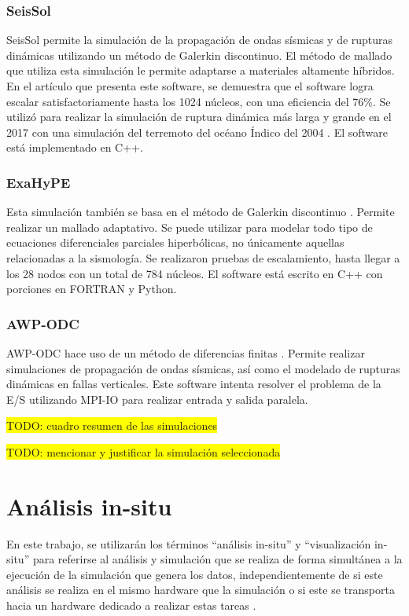 \subsubsection{SeisSol}
SeisSol \cite{Kser2010} permite la simulación de la propagación de ondas sísmicas y de rupturas dinámicas utilizando un método de Galerkin discontinuo. El método de mallado que utiliza esta simulación le permite adaptarse a materiales altamente híbridos. En el artículo que presenta este software, se demuestra que el software logra escalar satisfactoriamente hasta los 1024 núcleos, con una eficiencia del 76\%. Se utilizó para realizar la simulación de ruptura dinámica más larga y grande en el 2017 con una simulación del terremoto del océano Índico del 2004 \cite{Uphoff2017}. El software está implementado en C++.

\subsubsection{ExaHyPE}
Esta simulación también se basa en el método de Galerkin discontinuo \cite{Reinarz2020}. Permite realizar un mallado adaptativo. Se puede utilizar para modelar todo tipo de ecuaciones diferenciales parciales hiperbólicas, no únicamente aquellas relacionadas a la sismología. Se realizaron pruebas de escalamiento, hasta llegar a los 28 nodos con un total de 784 núcleos. El software está escrito en C++ con porciones en FORTRAN y Python.
\subsubsection{AWP-ODC}
AWP-ODC hace uso de un método de diferencias finitas \cite{Cui2010}. Permite realizar simulaciones de propagación de ondas sísmicas, así como el modelado de rupturas dinámicas en fallas verticales. Este software intenta resolver el problema de la E/S utilizando MPI-IO para realizar entrada y salida paralela.


\colorbox{yellow}{TODO: cuadro resumen de las simulaciones}

\colorbox{yellow}{TODO: mencionar y justificar la simulación seleccionada}
\section{Análisis in-situ}
En este trabajo, se utilizarán los términos ``análisis in-situ'' y ``visualización in-situ'' para referirse al análisis y simulación que se realiza de forma simultánea a la ejecución de la simulación que genera los datos, independientemente de si este análisis se realiza en el mismo hardware que la simulación o si este se transporta hacia un hardware dedicado a realizar estas tareas \cite{childs_terminology_2020}.

